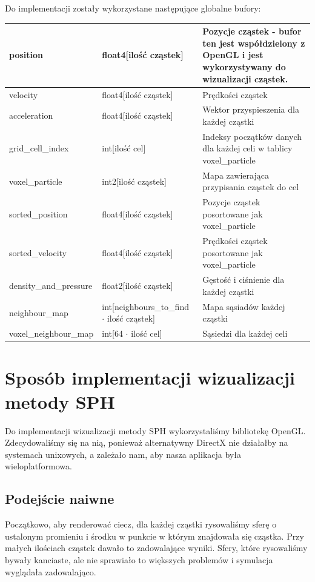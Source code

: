 \documentclass[polish, 12pt]{aghthesis}
\begin{document}
			\ \\
			\ \\
			Do implementacji zostały wykorzystane następujące globalne bufory:
			\ \\
			\begin{tabular}{| p{} | p{} | p{} |}
				\hline
					position & float4[ilość cząstek] & Pozycje cząstek - bufor ten jest współdzielony z OpenGL i jest wykorzystywany do wizualizacji cząstek. \\
				\hline
					velocity & float4[ilość cząstek] & Prędkości cząstek \\
				\hline
					acceleration & float4[ilość cząstek] & Wektor przyspieszenia dla każdej cząstki\\
				\hline
					grid\_cell\_index & int[ilość cel] & Indeksy początków danych dla każdej celi w tablicy voxel\_particle \\
				\hline
					voxel\_particle & int2[ilość cząstek] & Mapa zawierająca przypisania cząstek do cel \\ 
				\hline
					sorted\_position & float4[ilość cząstek] & Pozycje cząstek posortowane jak voxel\_particle\\
				\hline
					sorted\_velocity & float4[ilość cząstek] & Prędkości cząstek posortowane jak voxel\_particle\\
				\hline
					density\_and\_pressure & float2[ilość cząstek] & Gęstość i ciśnienie dla każdej cząstki\\
				\hline
					neighbour\_map & int[neighbours\_to\_find ${\cdot}$ ilość cząstek] & Mapa sąsiadów każdej cząstki\\
				\hline
					voxel\_neighbour\_map & int[64 ${\cdot}$ ilość cel] & Sąsiedzi dla każdej celi \\
				\hline
			\end{tabular}

\section{Sposób implementacji wizualizacji metody SPH}

	Do implementacji wizualizacji metody SPH wykorzystaliśmy bibliotekę OpenGL. Zdecydowaliśmy się na nią, ponieważ alternatywny DirectX nie działałby na systemach unixowych, a zależało nam, aby nasza aplikacja była wieloplatformowa.
	
	\subsection{Podejście naiwne}
		Początkowo, aby renderować ciecz, dla każdej cząstki rysowaliśmy sferę o ustalonym promieniu i środku w punkcie w którym znajdowała się cząstka. Przy małych ilościach cząstek dawało to zadowalające wyniki. Sfery, które rysowaliśmy bywały kanciaste, ale nie sprawiało to większych problemów i symulacja wyglądała zadowalająco.
		
\end{document}
